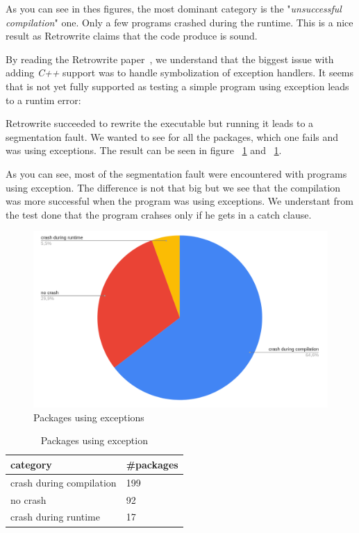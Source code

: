 \documentclass[a4paper,11pt,oneside]{report}
\newcommand{\sysname}{Retrowrite\xspace}
\begin{document}
As you can see in thes figures, the most dominant category is the
"\textit{unsuccessful compilation}" one. Only a few programs crashed during the
runtime. This is a nice result as \sysname claims that the code produce is
sound.

By reading the \sysname paper~\cite{dinesh20oakland}, we understand that
the biggest issue with adding \textit{C++} support was to handle symbolization
of exception handlers. It seems that is not yet fully supported as testing a
simple program using exception leads to a runtim error:



Retrowrite succeeded to rewrite the executable but running it leads to a segmentation fault.
We wanted to see for all the packages, which one fails and was using
exceptions. The result can be seen in figure ~\ref{fig:exception} and
~\ref{table:exception}.

As you can see, most of the segmentation fault were encountered with programs
using exception. The difference is not that big but we see that the compilation
was more successful when the program was using exceptions. We understant from
the test done that the program crahses only if he gets in a catch clause.

\newpage

\begin{figure}[h]
    \centering
    \includegraphics[width=15cm]{exception.png} 
    \caption{Packages using exceptions}
    \label{fig:exception}
\end{figure}

\begin{table}[h]
    \centering
    \begin{tabular}{ll} 
        \hline
        category                & \#packages  \\ 
        \hline
        crash during compilation & 199         \\
        no crash                 & 92          \\
        crash during runtime     & 17          \\
        \hline
    \end{tabular}
    \caption{Packages using exception}
    \label{table:exception}
\end{table}
\end{document}
